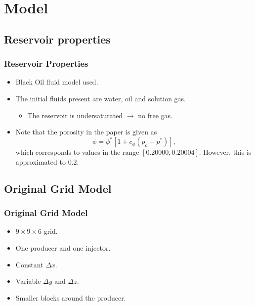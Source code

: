 \section{Model}

\subsection{Reservoir properties}
\begin{frame}
    \frametitle{Reservoir Properties}
    \begin{itemize}
        \item Black Oil fluid model used.
        \item The initial fluids present are water, oil and solution gas.
        \begin{itemize}
            \item The reservoir is undersaturated $\rightarrow$ no free gas.
        \end{itemize}
        \item Note that the porosity in the paper is given as
        \begin{equation}
            \phi = \phi^* [1 + c_\phi (p_o - p^*)],
        \end{equation}
        which corresponds to values in the range $[0.20000,0.20004]$. However, this is approximated to $0.2$.
    \end{itemize}
\end{frame}

\subsection{Original Grid Model}
\begin{frame}
    \frametitle{Original Grid Model}
    \begin{itemize}
        \item $9 \times 9 \times 6$ grid.
        \item One producer and one injector.
        \item Constant $\Delta x$.
        \item Variable $\Delta y$ and $\Delta z$.
        \item Smaller blocks around the producer.
    \end{itemize}
\end{frame}



